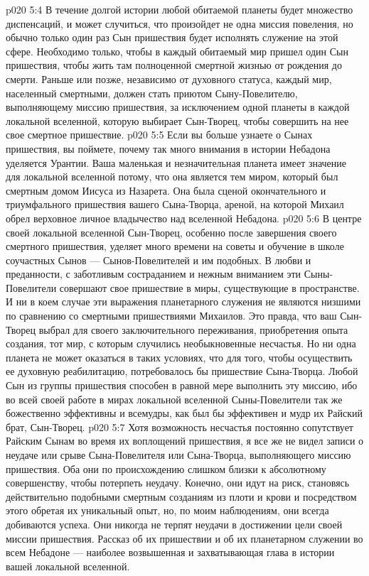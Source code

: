 \vs p020 5:4 В течение долгой истории любой обитаемой планеты будет множество диспенсаций, и может случиться, что произойдет не одна миссия повеления, но обычно только один раз Сын пришествия будет исполнять служение на этой сфере. Необходимо только, чтобы в каждый обитаемый мир пришел один Сын пришествия, чтобы жить там полноценной смертной жизнью от рождения до смерти. Раньше или позже, независимо от духовного статуса, каждый мир, населенный смертными, должен стать приютом Сыну\hyp{}Повелителю, выполняющему миссию пришествия, за исключением одной планеты в каждой локальной вселенной, которую выбирает Сын\hyp{}Творец, чтобы совершить на нее свое смертное пришествие.
\vs p020 5:5 \pc Если вы больше узнаете о Сынах пришествия, вы поймете, почему так много внимания в истории Небадона уделяется Урантии. Ваша маленькая и незначительная планета имеет значение для локальной вселенной потому, что она является тем миром, который был смертным домом Иисуса из Назарета. Она была сценой окончательного и триумфального пришествия вашего Сына\hyp{}Творца, ареной, на которой Михаил обрел верховное личное владычество над вселенной Небадона.
\vs p020 5:6 В центре своей локальной вселенной Сын\hyp{}Творец, особенно после завершения своего смертного пришествия, уделяет много времени на советы и обучение в школе соучастных Сынов --- Сынов\hyp{}Повелителей и им подобных. В любви и преданности, с заботливым состраданием и нежным вниманием эти Сыны\hyp{}Повелители совершают свое пришествие в миры, существующие в пространстве. И ни в коем случае эти выражения планетарного служения не являются низшими по сравнению со смертными пришествиями Михаилов. Это правда, что ваш Сын\hyp{}Творец выбрал для своего заключительного переживания, приобретения опыта создания, тот мир, с которым случились необыкновенные несчастья. Но ни одна планета не может оказаться в таких условиях, что для того, чтобы осуществить ее духовную реабилитацию, потребовалось бы пришествие Сына\hyp{}Творца. Любой Сын из группы пришествия способен в равной мере выполнить эту миссию, ибо во всей своей работе в мирах локальной вселенной Сыны\hyp{}Повелители так же божественно эффективны и всемудры, как был бы эффективен и мудр их Райский брат, Сын\hyp{}Творец.
\vs p020 5:7 \pc Хотя возможность несчастья постоянно сопутствует Райским Сынам во время их воплощений пришествия, я все же не видел записи о неудаче или срыве Сына\hyp{}Повелителя или Сына\hyp{}Творца, выполняющего миссию пришествия. Оба они по происхождению слишком близки к абсолютному совершенству, чтобы потерпеть неудачу. Конечно, они идут на риск, становясь действительно подобными смертным созданиям из плоти и крови и посредством этого обретая их уникальный опыт, но, по моим наблюдениям, они всегда добиваются успеха. Они никогда не терпят неудачи в достижении цели своей миссии пришествия. Рассказ об их пришествии и об их планетарном служении во всем Небадоне --- наиболее возвышенная и захватывающая глава в истории вашей локальной вселенной.
